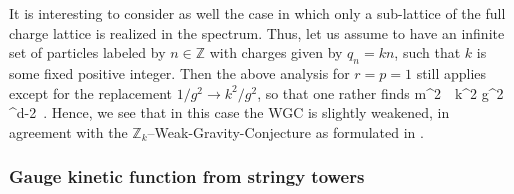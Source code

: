 It is interesting to consider as well the case in which only a sub-lattice of the full charge lattice is realized in the spectrum. Thus, let us assume to have an infinite set of particles labeled by $n\in \mathbb{Z}$ with charges given by $q_n=kn$, such that $k$ is some fixed positive integer. Then the above analysis for $r=p=1$ still applies except for the replacement $1/g^2\rightarrow k^2/g^2$, so that one rather finds
%
\beq
  m^2\, \lesssim\, k^2 g^2 \Mpd^{d-2}\, .
\eeq
%
Hence, we see that in this case the WGC is slightly weakened, in agreement with the $\mathbb{Z}_k$--Weak-Gravity-Conjecture as formulated in \cite{Buratti:2020kda}.
	
	
\subsubsection*{Gauge kinetic function from stringy towers}

